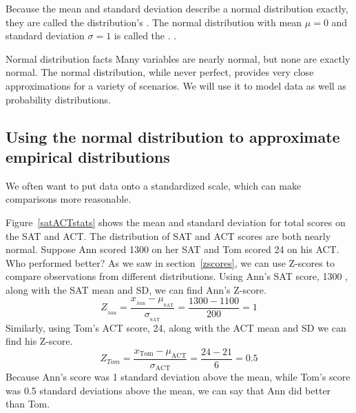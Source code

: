 Because the mean and standard deviation describe a normal distribution exactly, they are called the distribution's .  The normal distribution with mean $\mu=0$ and standard deviation $\sigma = 1$ is called the .%
.


\begin{onebox}{Normal distribution facts}
Many variables are nearly normal, but none are exactly normal. The normal distribution, while never perfect, provides very close approximations for a variety of scenarios. We will use it to model data as well as probability distributions.\vspace{0.7mm}\end{onebox}


\B{\newpage}

\subsection{Using the normal distribution to approximate empirical distributions}
\noindent%
We often want to put data onto a standardized scale,
which can make comparisons more reasonable.

\newcommand{\satmean}{1100}
\newcommand{\satsd}{200}
\newcommand{\actmean}{21}
\newcommand{\actsd}{6}
\newcommand{\annsatscore}{1300}
\newcommand{\annsatzscore}{1}
\newcommand{\tomsatscore}{24}
\newcommand{\tomsatzscore}{0.5}



 \begin{examplewrap}
\begin{nexample}{ Figure~\vref{satACTstats} shows the mean
    and standard deviation for total scores on the SAT and ACT.
    The distribution of SAT and ACT scores are both nearly normal.  Suppose Ann scored \annsatscore{} on her SAT and Tom scored
    \tomsatscore{} on his ACT.
    Who performed better?}
As we saw in section~\ref{zscores}, we can use Z-scores to compare observations from different distributions.  Using Ann's SAT score, \annsatscore{} , along with the SAT mean and SD, we can find Ann's Z-score.
$$Z_{_{\text{Ann}}}
  = \frac{x_{_{\text{Ann}}} - \mu_{_{\text{SAT}}}}
      {\sigma_{_{\text{SAT}}}}
  = \frac{\annsatscore{} - \satmean{}}{\satsd{}}
  = \annsatzscore{}$$
Similarly, using Tom's ACT score, \tomsatscore{}, along with the ACT mean and
SD we can find his Z-score.
$$Z_{Tom}
  = \frac{x_{\text{Tom}} - \mu_{\text{ACT}}}
      {\sigma_{\text{ACT}}}
  = \frac{\tomsatscore{} - \actmean{}}{\actsd{}}
  = \tomsatzscore{}$$
Because Ann's score was 1 standard deviation above the mean, while Tom's score was 0.5 standard deviations above the mean, we can say that Ann did better than Tom.
 \end{nexample}
\end{examplewrap}

